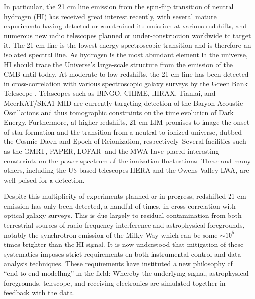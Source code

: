 In particular, the 21 cm line emission from the spin-flip transition of neutral hydrogen (HI) has received great interest recently, with several mature experiments having detected or constrained its emission at various redshifts, and numerous new radio telescopes planned or under-construction worldwide to target it. The 21 cm line is the lowest energy spectroscopic transition and is therefore an isolated spectral line. As hydrogen is the most abundant element in the universe, HI should trace the Universe's large-scale structure from the emission of the CMB until today. At moderate to low redshifts, the 21 cm line has been detected in cross-correlation with various spectroscopic galaxy surveys by the Green Bank Telescope \citep{changetal, masuietalgbt, switzeretalgbt, andersonetalparkes}. Telescopes such as BINGO, CHIME, HIRAX, Tianlai, and MeerKAT/SKA1-MID are currently targeting detection of the Baryon Acoustic Oscillations and thus tomographic constraints on the time evolution of Dark Energy. Furthermore, at higher redshifts, 21 cm LIM promises to image the onset of star formation and the transition from a neutral to ionized universe, dubbed the Cosmic Dawn and Epoch of Reionization, respectively. Several facilities such as the GMRT, PAPER, LOFAR, and the MWA have placed interesting constraints on the power spectrum of the ionization fluctuations. These and many others, including the US-based telescopes HERA \citep{hera} and the Owens Valley LWA, are well-poised for a detection.

Despite this multiplicity of experiments planned or in progress, redshifted 21 cm emission has only been detected, a handful of times, in cross-correlation with optical galaxy surveys. This is due largely to residual contamination from both terrestrial sources of radio-frequency interference and astrophysical foregrounds, notably the synchrotron emission of the Milky Way which can be some $\sim 10^5$ times brighter than the HI signal. It is now understood that mitigation of these systematics imposes strict requirements on both instrumental control and data analysis techniques. These requirements have instituted a new philosophy of ``end-to-end modelling'' in the field: Whereby the underlying signal, astrophysical foregrounds, telescope, and receiving electronics are simulated together in feedback with the data.

